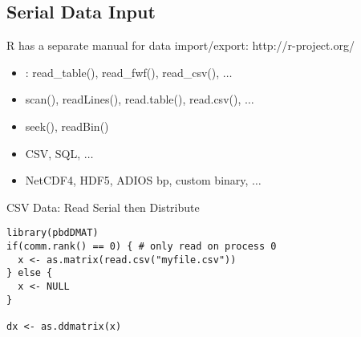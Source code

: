 \subsection{Serial Data Input}
\makesubcontentsslidessec


\begin{frame}
\begin{block}{R has a separate manual for data import/export: http://r-project.org/}
\begin{itemize}
\item {}: read\_table(), read\_fwf(), read\_csv(), $\ldots$
\item scan(), readLines(), read.table(), read.csv(), $\ldots$
\item seek(), readBin()
\item CSV, SQL, $\ldots$
\item NetCDF4, HDF5, ADIOS bp, custom binary, $\ldots$
\end{itemize}
\end{block}
\end{frame}

\begin{frame}[fragile]
  \begin{exampleblock}{CSV Data: Read Serial then Distribute}\pause
\begin{lstlisting}[title=0\_readcsv.r]
library(pbdDMAT)
if(comm.rank() == 0) { # only read on process 0
  x <- as.matrix(read.csv("myfile.csv"))
} else {
  x <- NULL
}

dx <- as.ddmatrix(x)
\end{lstlisting}
  \end{exampleblock}
\end{frame}
